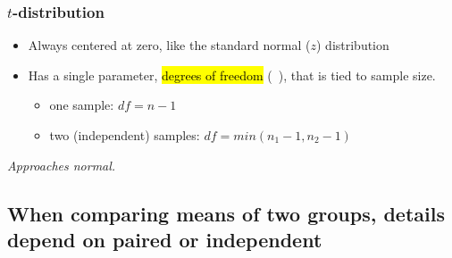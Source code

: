 \documentclass[t,compress,mathserif,11pt,t,professionalfonts,xcolor=table]{beamer}
\newcommand{\soln}[1]{\textit{#1}}
\begin{document}

\begin{frame}
\frametitle{$t$-distribution}

\begin{itemize}

\item Always centered at zero, like the standard normal ($z$) distribution

\pause

\item Has a single parameter, \hl{degrees of freedom} (~), that is tied to sample size.
\begin{itemize}
\item one sample: $df = n - 1$
\item two (independent) samples: $df = min(n_1 - 1, n_2 - 1)$
\end{itemize}

\end{itemize}

\pause

 \pause
{}
{
\soln{\pause Approaches normal.}
\pause
{}
}

\end{frame}


\subsection{When comparing means of two groups, details depend on paired or independent}
\label{mi2}
\end{document}
